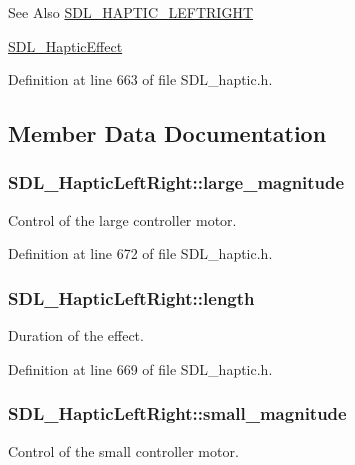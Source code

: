 \begin{DoxySeeAlso}{See Also}
\hyperlink{_s_d_l__haptic_8h_ae047624d8458ff6400887c37a36f86d3}{S\-D\-L\-\_\-\-H\-A\-P\-T\-I\-C\-\_\-\-L\-E\-F\-T\-R\-I\-G\-H\-T} 

\hyperlink{union_s_d_l___haptic_effect}{S\-D\-L\-\_\-\-Haptic\-Effect} 
\end{DoxySeeAlso}


Definition at line 663 of file S\-D\-L\-\_\-haptic.\-h.



\subsection{Member Data Documentation}
\hypertarget{struct_s_d_l___haptic_left_right_a8cd16fe2200ef10cc4f3b4209adef959}{
\subsubsection[{large\-\_\-magnitude}]{ S\-D\-L\-\_\-\-Haptic\-Left\-Right\-::large\-\_\-magnitude}}\label{struct_s_d_l___haptic_left_right_a8cd16fe2200ef10cc4f3b4209adef959}
Control of the large controller motor. 

Definition at line 672 of file S\-D\-L\-\_\-haptic.\-h.

\hypertarget{struct_s_d_l___haptic_left_right_a5b942fee53f1ec77d3fb91a6e89b0196}{
\subsubsection[{length}]{ S\-D\-L\-\_\-\-Haptic\-Left\-Right\-::length}}\label{struct_s_d_l___haptic_left_right_a5b942fee53f1ec77d3fb91a6e89b0196}
Duration of the effect. 

Definition at line 669 of file S\-D\-L\-\_\-haptic.\-h.

\hypertarget{struct_s_d_l___haptic_left_right_aaa1f2c1e767a780e447d82efce6cd1cf}{
\subsubsection[{small\-\_\-magnitude}]{ S\-D\-L\-\_\-\-Haptic\-Left\-Right\-::small\-\_\-magnitude}}\label{struct_s_d_l___haptic_left_right_aaa1f2c1e767a780e447d82efce6cd1cf}
Control of the small controller motor. 

